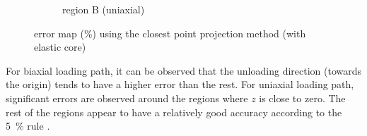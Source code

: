 \begin{figure}[htb]
\begin{subfigure}{.48\textwidth}
    \caption{region B (uniaxial)}\label{fig:error_euler_with_core_b}
\end{subfigure}
\caption{error map (\si{\percent}) using the closest point projection method (with elastic core)}\label{fig:error_euler_with_core}
\end{figure}

For biaxial loading path, it can be observed that the unloading direction (towards the origin) tends to have a higher error than the rest.
For uniaxial loading path, significant errors are observed around the regions where $z$ is close to zero.
The rest of the regions appear to have a relatively good accuracy according to the \SI{5}{\percent} rule \citep[see][pg.~132]{Simo1998}.

